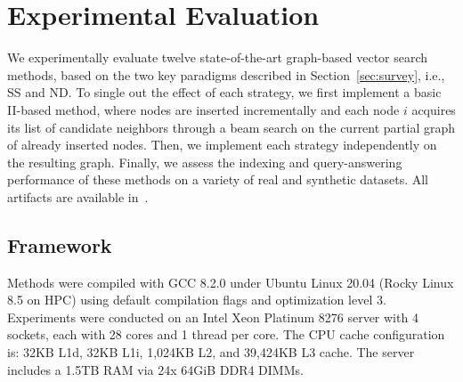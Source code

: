 \section{Experimental Evaluation}
\label{sec:experiments}
We experimentally evaluate twelve state-of-the-art graph-based vector search methods, 
based on the two key paradigms described in Section~\ref{sec:survey}, i.e., SS and ND. 
To single out the effect of each strategy, we first implement a basic II-based method, where nodes are inserted incrementally and each node $i$ acquires its list of candidate neighbors through a beam search on the current partial graph of already inserted nodes.  Then, we implement each strategy independently on the resulting graph. 
Finally, we assess the indexing and query-answering performance of these methods on a variety of real and 
synthetic datasets.
All artifacts are available in~\cite{url/GASS}.
\subsection{Framework}

Methods were compiled with GCC 8.2.0 under Ubuntu Linux 20.04 (Rocky Linux 8.5 on HPC) using default compilation flags and optimization level 3. Experiments were conducted on an Intel Xeon Platinum 8276 server with 4 sockets, each with 28 cores and 1 thread per core.
The CPU cache configuration is: 32KB L1d, 32KB L1i, 1,024KB L2, and 39,424KB L3 cache. The server includes a 1.5TB RAM via 24x 64GiB DDR4 DIMMs.


